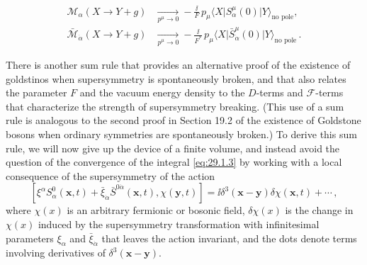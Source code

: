 \begin{equation}
  \begin{aligned}
  \mathcal M_\alpha(X\to Y+g)
  &\xrightarrow[p^\mu\to0]{}
  -\frac{\ii}{F}\,
  p_\mu\langle X\lvert S^\mu_\alpha(0)
    \rvert Y\rangle_{\text{no pole}},
  \\
  \bar{\mathcal M}_{\dot\alpha}(X\to Y+g)
  &\xrightarrow[p^\mu\to0]{}
  -\frac{\ii}{F^*}\,
  p_\mu\langle X\lvert\bar S^\mu_{\dot\alpha}(0)
    \rvert Y\rangle_{\text{no pole}}\,.
  \end{aligned}
  \tag{29.2.10}\label{eq:29.2.10}
\end{equation}

There is another sum rule that provides an alternative proof of the
existence of goldstinos when supersymmetry is spontaneously broken, and
that also relates the parameter \(F\) and the vacuum energy density to the
\(D\)-terms and \(\mathcal{F}\)-terms that characterize the strength of
supersymmetry breaking. (This use of a sum rule is analogous to the second
proof in Section 19.2 of the existence of Goldstone bosons when ordinary
symmetries are spontaneously broken.) To derive this sum rule, we will now
give up the device of a finite volume, and instead avoid the question of
the convergence of the integral \eqref{eq:29.1.3} by working with a local
consequence of the supersymmetry of the action
\begin{equation}
  \left[
    \xi^\alpha S^0_\alpha(\mathbf x,t)
    +\bar\xi_{\dot\alpha}\bar S^{0\dot\alpha}(\mathbf x,t),
    \chi(\mathbf y,t)
  \right]
  =
  \ii\delta^3(\mathbf x-\mathbf y)\delta\chi(\mathbf x,t)+\cdots\,,
  \tag{29.2.11}\label{eq:29.2.11}
\end{equation}
where \(\chi(x)\) is an arbitrary fermionic or bosonic field,
\(\delta\chi(x)\) is the change in \(\chi(x)\) induced by the supersymmetry
transformation with infinitesimal parameters \(\xi_\alpha\) and
\(\bar\xi_{\dot\alpha}\) that leaves the
action invariant, and the dots denote terms involving derivatives of
\(\delta^3(\mathbf x-\mathbf y)\).

